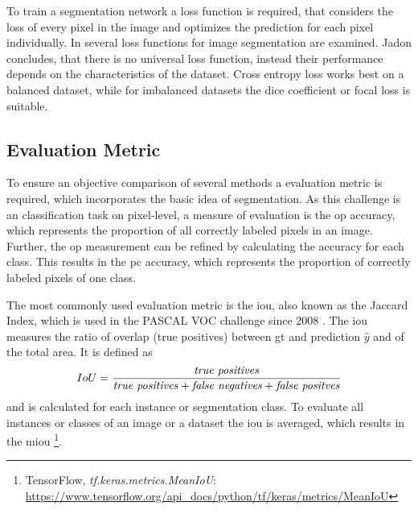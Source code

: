To train a segmentation network a loss function is required, that considers the loss of every pixel in the image and optimizes the prediction for each pixel individually.
In \cite{Jad20-LossFunction} several loss functions for image segmentation are examined.
Jadon concludes, that there is no universal loss function, instead their performance depends on the characteristics of the dataset.
Cross entropy loss works best on a balanced dataset, while for imbalanced datasets the dice coefficient or focal loss is suitable.


\subsection{Evaluation Metric}\label{ord:ch2:sec2:subsec2}
To ensure an objective comparison of several methods a evaluation metric is required, which incorporates the basic idea of segmentation.
As this challenge is an classification task on pixel-level, a measure of evaluation is the \gls{op} accuracy, which represents the proportion of all correctly labeled pixels in an image.
Further, the \gls{op} measurement can be refined by calculating the accuracy for each class.
This results in the \gls{pc} accuracy, which represents the proportion of correctly labeled pixels of one class.


The most commonly used evaluation metric is the \gls{iou}, also known as the Jaccard Index, which is used in the PASCAL VOC challenge \cite{Eve20-PascalVOC} since 2008 \cite{Csu13-EvalMetric}. 
The \gls{iou} measures the ratio of overlap (true positives) between \gls{gt} and prediction $\hat{y}$ and of the total area. 
It is defined as
\begin{equation} \label{equ:iou}
	\centering
	IoU = \frac{\textnormal{\textit{true positives}}}{\textnormal{\textit{true positives}} + \textnormal{\textit{false negatives}} + \textnormal{\textit{false positves}}}
\end{equation}
and is calculated for each instance or segmentation class.
To evaluate all instances or classes of an image or a dataset the \gls{iou} is averaged, which results in the \gls{miou} 
\footnote{TensorFlow, \textit{tf.keras.metrics.MeanIoU}: \url{https://www.tensorflow.org/api_docs/python/tf/keras/metrics/MeanIoU}}.

